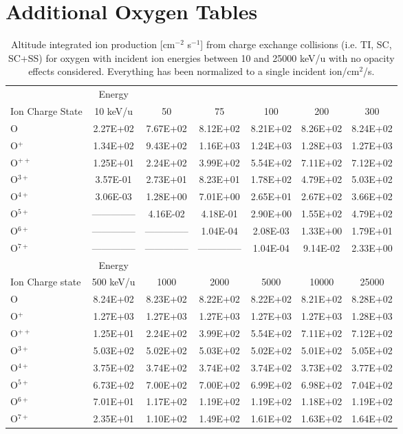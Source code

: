 \section{Additional Oxygen Tables}
\label{app:Oxy}

\begin{table}[ht]
    \centering
    \caption{Altitude integrated ion production [cm$^{-2}$ s$^{-1}$] from charge exchange collisions (i.e. TI, SC, SC+SS) for oxygen with incident ion energies between 10 and 25000 keV/u with no opacity effects considered. Everything has been normalized to a single incident ion/cm$^2$/s.}
    \begin{tabular}{l|c|c|c|c|c|c}
    \hline
    & Energy & & & & & \\
    Ion Charge State & 10 keV/u & 50 & 75 & 100 & 200 & 300 \\
    \hline
    O & 2.27E+02 & 7.67E+02 & 8.12E+02 & 8.21E+02 & 8.26E+02 & 8.24E+02 \\
    O$^+$ & 1.34E+02 & 9.43E+02 & 1.16E+03 & 1.24E+03 & 1.28E+03 & 1.27E+03 \\
    O$^{++}$ & 1.25E+01 & 2.24E+02 & 3.99E+02 & 5.54E+02 & 7.11E+02 & 7.12E+02 \\
    O$^{3+}$ & 3.57E-01 & 2.73E+01 & 8.23E+01 & 1.78E+02 & 4.79E+02 & 5.03E+02 \\
    O$^{4+}$ & 3.06E-03 & 1.28E+00 & 7.01E+00 & 2.65E+01 & 2.67E+02 & 3.66E+02 \\
    O$^{5+}$ & -------------- & 4.16E-02 & 4.18E-01 & 2.90E+00 & 1.55E+02 & 4.79E+02 \\
    O$^{6+}$ & -------------- & -------------- & 1.04E-04 & 2.08E-03 & 1.33E+00 & 1.79E+01 \\
    O$^{7+}$ & -------------- & -------------- & -------------- & 1.04E-04 & 9.14E-02 & 2.33E+00 \\
    \hline
    \hline
    & Energy & & & & & \\
    Ion Charge state & 500 keV/u & 1000 & 2000 & 5000 & 10000 & 25000 \\
    \hline
    O & 8.24E+02 & 8.23E+02 & 8.22E+02 & 8.22E+02 & 8.21E+02 & 8.28E+02 \\
    O$^+$ & 1.27E+03 & 1.27E+03 & 1.27E+03 & 1.27E+03 & 1.27E+03 & 1.28E+03 \\
    O$^{++}$ & 1.25E+01 & 2.24E+02 & 3.99E+02 & 5.54E+02 & 7.11E+02 & 7.12E+02 \\
    O$^{3+}$ & 5.03E+02 & 5.02E+02 & 5.03E+02 & 5.02E+02 & 5.01E+02 & 5.05E+02 \\
    O$^{4+}$ & 3.75E+02 & 3.74E+02 & 3.74E+02 & 3.74E+02 & 3.73E+02 & 3.77E+02 \\
    O$^{5+}$ & 6.73E+02 & 7.00E+02 & 7.00E+02 & 6.99E+02 & 6.98E+02 & 7.04E+02 \\
    O$^{6+}$ & 7.01E+01 & 1.17E+02 & 1.19E+02 & 1.19E+02 & 1.18E+02 & 1.19E+02 \\
    O$^{7+}$ & 2.35E+01 & 1.10E+02 & 1.49E+02 & 1.61E+02 & 1.63E+02 & 1.64E+02 \\
    \hline
    \end{tabular}
    \label{tab:OxyCXProd}
\end{table}

